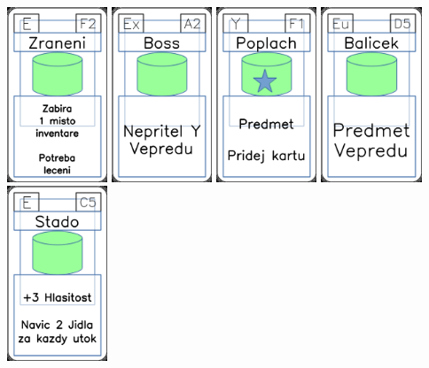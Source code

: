 \documentclass[a4paper]{article}
\begin{document}
	\includegraphics[width=3.0cm]{img-4_56}
	\includegraphics[width=3.0cm]{img-4_1}
	\includegraphics[width=3.0cm]{img-5_25}
	\includegraphics[width=3.0cm]{img-4_19}
	\includegraphics[width=3.0cm]{img-4_44}
\end{document}
